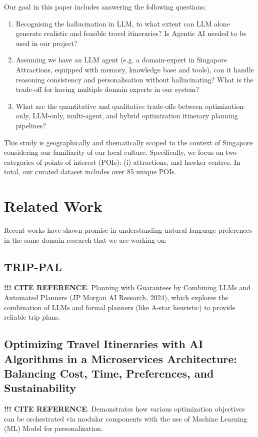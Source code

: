 \documentclass{ecai}
\begin{document}
Our goal in this paper includes answering the following questions: 
\begin{enumerate}
    \item Recognising the hallucination in LLM, to what extent can LLM alone generate realistic and feasible travel itineraries? Is Agentic AI needed to be used in our project?
    \item Assuming we have an LLM agent (e.g. a domain-expert in Singapore Attractions, equipped with memory, knowledge base and tools), can it handle reasoning consistency and personalisation without hallucinating? What is the trade-off for having multiple domain experts in our system?
    \item What are the quantitative and qualitative trade-offs between optimization-only, LLM-only, multi-agent, and hybrid optimization itinerary planning pipelines?
\end{enumerate}

This study is geographically and thematically scoped to the context of Singapore considering our familiarity of our local culture. Specifically, we focus on two categories of points of interest (POIs): (i) attractions, and hawker centres. In total, our curated dataset includes over 85 unique POIs.


\section{Related Work}
Recent works have shown promise in understanding natural language preferences in the same domain research that we are working on:

\subsection{TRIP-PAL}
\textbf{!!! CITE REFERENCE}. Planning with Guarantees by Combining LLMs and Automated Planners (JP Morgan AI Research, 2024), which explores the combination of LLMs and formal planners (like A-star heuristic) to provide reliable trip plans.

\subsection{Optimizing Travel Itineraries with AI Algorithms in a Microservices Architecture: Balancing Cost, Time, Preferences, and Sustainability}
\textbf{!!! CITE REFERENCE}. Demonstrates how various optimization objectives can be orchestrated via modular components with the use of Machine Learning (ML) Model for personalization.
\end{document}
